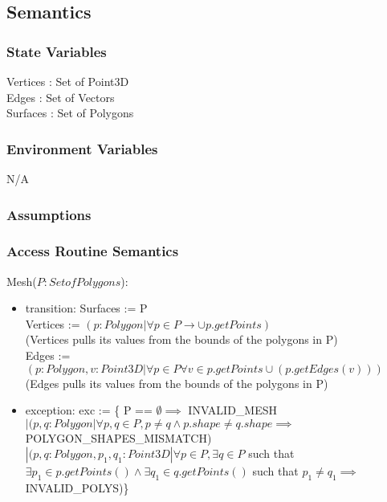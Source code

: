 \documentclass[12pt, titlepage]{article}
\begin{document}
\subsection{Semantics}
\subsubsection{State Variables}
Vertices : Set of Point3D\\
Edges : Set of Vectors\\
Surfaces : Set of Polygons\\

\subsubsection{Environment Variables}
N/A

\subsubsection{Assumptions}

\subsubsection{Access Routine Semantics}
\noindent Mesh($P:Set of Polygons$):
\begin{itemize}
	\item transition: Surfaces := P \\
	Vertices := $(p:Polygon | \forall p \in P \to \cup p.getPoints)$\\
	(Vertices pulls its values from the bounds of the polygons in P)\\
	Edges := $(p:Polygon, v:Point3D | \forall p \in P \forall v \in p.getPoints 
	\cup (p.getEdges(v)))$\\
	(Edges pulls its values from the bounds of the polygons in P)\\
	\item exception: exc := \{ P == $\emptyset \implies$ INVALID\_MESH\\ $| 
	(p,q:Polygon| \forall p, q \in P, p \neq q \land p.shape \neq q.shape 
	\implies$ POLYGON\_SHAPES\_MISMATCH)\\ $| (p,q:Polygon, 
	p_{1},q_{1}:Point3D| 
	\forall p \in P, \exists q \in P$ such that $\exists p_{1} \in 
	p.getPoints() 
	\land \exists q_{1} \in q.getPoints()$ such that $p_{1} \neq q_{1} 
	\implies$ 
	INVALID\_POLYS)\}\\
	
\end{itemize}
\end{document}
